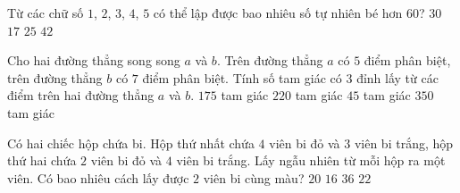 \begin{ex}%
	Từ các chữ số $ 1 $, $ 2 $, $ 3 $, $ 4 $, $ 5 $ có thể lập được bao nhiêu số tự nhiên bé hơn $ 60 $?
	\choice
	{\True $30$}
	{$17$}
	{$25$}
	{$42$}
\end{ex}

\begin{ex}%
	Cho hai đường thẳng song song $a$ và $b$. Trên đường thẳng $a$ có $5$ điểm phân biệt, trên đường thẳng $b$ có $7$ điểm phân biệt. Tính số tam giác có $3$ đỉnh lấy từ các điểm trên hai đường thẳng $a$ và $b$.
	\choice
	{\True $175$ tam giác}
	{$220$ tam giác}
	{$45$ tam giác}
	{$350$ tam giác}
\end{ex}
\begin{ex}%
	Có hai chiếc hộp chứa bi. Hộp thứ nhất chứa $4$ viên bi đỏ và $3$ viên bi trắng, hộp thứ hai chứa $2$ viên bi đỏ và $4$ viên bi trắng. Lấy ngẫu nhiên từ mỗi hộp ra một viên. Có bao nhiêu cách lấy được $2$ viên bi cùng màu?
	\choice
	{\True $20$}
	{$16$}
	{$36$}
	{$22$}
\end{ex}
